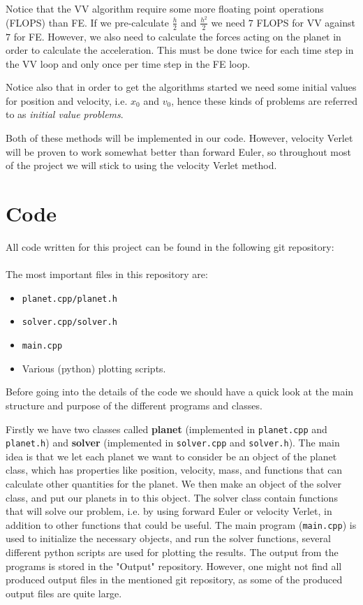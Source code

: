 \documentclass[12pt, a4paper]{article}
\begin{document}
Notice that the VV algorithm require some more floating point operations (FLOPS) than FE. If we 
pre-calculate $\frac{h}{2}$ and $\frac{h^2}{2}$ we need $7$ FLOPS for VV against $7$ for FE. However, 
we also need to calculate the forces acting on the planet in order to calculate the acceleration. This 
must be done twice for each time step in the VV loop and only once per time step in the FE loop. 

Notice also that in order to get the algorithms started we need some initial values for position and 
velocity, i.e. $x_0$ and $v_0$, hence these kinds of problems are referred to as \textit{initial 
value problems}.   

Both of these methods will be implemented in our code. However, velocity Verlet will be 
proven to work somewhat better than forward Euler, so throughout most of the project we 
will stick to using the velocity Verlet method.  

\section{Code}

All code written for this project can be found in the following git repository: \vspace{0.5cm} \\ 
 \vspace{0.5cm} \\ 
The most important files in this repository are:  
\begin{itemize}
\item \texttt{planet.cpp/planet.h}
\item \texttt{solver.cpp/solver.h}
\item \texttt{main.cpp}
\item Various (python) plotting scripts. 
\end{itemize}
Before going into the details of the code we should have a quick look at the main structure and purpose 
of the different programs and classes. 

Firstly we have two classes called \textbf{planet} (implemented in \texttt{planet.cpp} and 
\texttt{planet.h}) and \textbf{solver} (implemented in \texttt{solver.cpp} and \texttt{solver.h}). 
The main idea is that we let each planet we want to consider be an object of the planet class, 
which has properties like position, velocity, mass, and functions that can calculate other quantities 
for the planet. We then make an object of the solver class, and put our planets in to this object. 
The solver class contain functions that will solve our problem, i.e. by using forward Euler or 
velocity Verlet, in addition to other functions that could be useful. The main program (\texttt{main.cpp}) 
is used to initialize the necessary objects, and run the solver functions, several different python 
scripts are used for plotting the results. The output from the programs is stored in 
the "Output" repository. However, one might not find all produced output files in the mentioned git 
repository, as some of the produced output files are quite large.  
\end{document}
